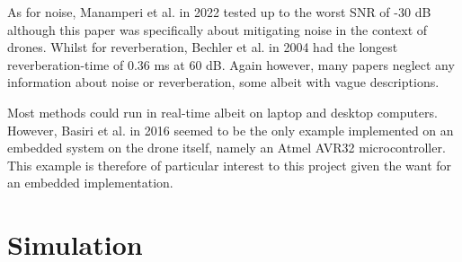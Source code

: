 \documentclass{report}
\begin{document}
As for noise, Manamperi et al. in 2022 \cite{manamperi_drone_2022} tested up to the worst SNR of -30 \si{dB} although this paper was specifically about mitigating noise in the context of drones. Whilst for reverberation, Bechler et al. in 2004 \cite{bechler_system_2004} had the longest reverberation-time of 0.36 \si{ms} at 60 \si{dB}. Again however, many papers neglect any information about noise or reverberation, some albeit with vague descriptions.

Most methods could run in real-time albeit on laptop and desktop computers. However, Basiri et al. in 2016 \cite{basiri_-board_2016} seemed to be the only example implemented on an embedded system on the drone itself, namely an Atmel AVR32 microcontroller. This example is therefore of particular interest to this project given the want for an embedded implementation.

\chapter{Simulation}






%
%
%
\end{document}
